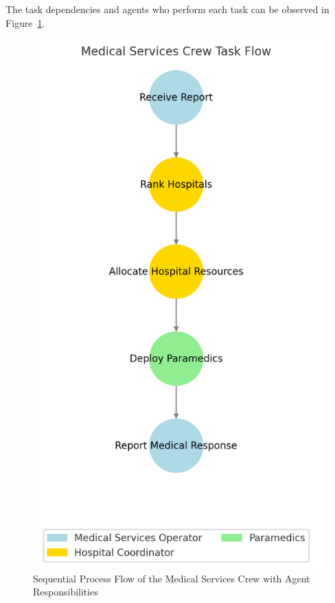 The task dependencies and agents who perform each task can be observed in Figure~\ref{fig:medical_services_flow}.

\begin{figure}[ht!]
	\centering
	\includegraphics[height=0.6\textheight]{figures/Medical_Services_Crew_Flow.png}
	\caption{Sequential Process Flow of the Medical Services Crew with Agent Responsibilities}
	\label{fig:medical_services_flow}
\end{figure}

